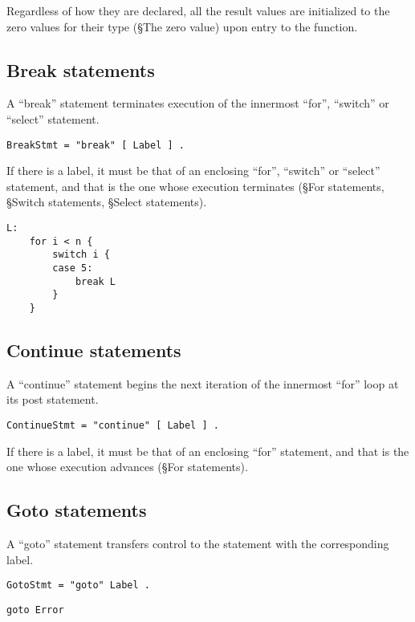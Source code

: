 Regardless of how they are declared, all the result values are
initialized to the zero values for their type
(§The zero value) upon entry to the
function.

\subsection*{Break statements}

A ``break'' statement terminates execution of the innermost ``for'',
``switch'' or ``select'' statement.

\begin{Verbatim}[frame=single]
BreakStmt = "break" [ Label ] .
\end{Verbatim}

If there is a label, it must be that of an enclosing ``for'', ``switch''
or ``select'' statement, and that is the one whose execution terminates
(§For statements,
§Switch statements,
§Select statements).

\begin{Verbatim}[frame=single]
L:
    for i < n {
        switch i {
        case 5:
            break L
        }
    }
\end{Verbatim}

\subsection*{Continue statements}

A ``continue'' statement begins the next iteration of the innermost
``for'' loop at its post statement.

\begin{Verbatim}[frame=single]
ContinueStmt = "continue" [ Label ] .
\end{Verbatim}

If there is a label, it must be that of an enclosing ``for'' statement,
and that is the one whose execution advances
(§For statements).

\subsection*{Goto statements}

A ``goto'' statement transfers control to the statement with the
corresponding label.

\begin{Verbatim}[frame=single]
GotoStmt = "goto" Label .
\end{Verbatim}

\begin{Verbatim}[frame=single]
goto Error
\end{Verbatim}

